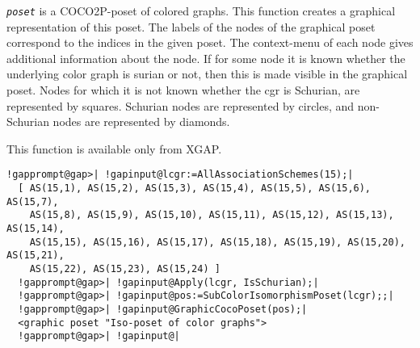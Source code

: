 \documentclass[a4paper,11pt]{report}
\begin{document}
{{{ \mbox{\texttt{\mdseries\slshape poset}} is a \textsf{COCO2P}-poset of colored graphs. This function creates a graphical representation of
this poset. The labels of the nodes of the graphical poset correspond to the
indices in the given poset. The context-menu of each node gives additional
information about the node. If for some node it is known whether the
underlying color graph is surian or not, then this is made visible in the
graphical poset. Nodes for which it is not known whether the cgr is Schurian,
are represented by squares. Schurian nodes are represented by circles, and
non-Schurian nodes are represented by diamonds. 

 This function is available only from \textsf{XGAP}. 
\begin{Verbatim}[commandchars=!@|,fontsize=\small,frame=single,label=Example]
  !gapprompt@gap>| !gapinput@lcgr:=AllAssociationSchemes(15);|
  [ AS(15,1), AS(15,2), AS(15,3), AS(15,4), AS(15,5), AS(15,6), AS(15,7),
    AS(15,8), AS(15,9), AS(15,10), AS(15,11), AS(15,12), AS(15,13), AS(15,14),
    AS(15,15), AS(15,16), AS(15,17), AS(15,18), AS(15,19), AS(15,20), AS(15,21),
    AS(15,22), AS(15,23), AS(15,24) ]
  !gapprompt@gap>| !gapinput@Apply(lcgr, IsSchurian);|
  !gapprompt@gap>| !gapinput@pos:=SubColorIsomorphismPoset(lcgr);;|
  !gapprompt@gap>| !gapinput@GraphicCocoPoset(pos);|
  <graphic poset "Iso-poset of color graphs">
  !gapprompt@gap>| !gapinput@|
  	    
\end{Verbatim}
 }

 }

 }

 
\end{document}

